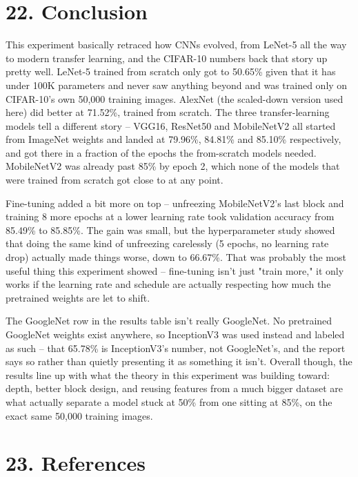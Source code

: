 \documentclass[11pt]{article}
\begin{document}

\section*{22. Conclusion}

This experiment basically retraced how CNNs evolved, from LeNet-5 all the
way to modern transfer learning, and the CIFAR-10 numbers back that story up
pretty well. LeNet-5 trained from scratch only got to 50.65\% given that it has under 100K parameters and never saw anything beyond and was trained only on CIFAR-10's own 50,000 training images. AlexNet (the scaled-down version used
here) did better at 71.52\%, trained from scratch. The three transfer-learning models tell a different story -- VGG16, ResNet50 and MobileNetV2 all started from ImageNet weights and landed at 79.96\%, 84.81\% and 85.10\% respectively, and got there in a fraction of the epochs the from-scratch models needed. MobileNetV2 was already past 85\% by epoch 2, which none of the models that were trained from scratch got close to at any point.

Fine-tuning added a bit more on top -- unfreezing MobileNetV2's last block
and training 8 more epochs at a lower learning rate took validation accuracy
from 85.49\% to 85.85\%. The gain was small, but the hyperparameter study showed that doing the same kind of unfreezing carelessly (5 epochs, no
learning rate drop) actually made things worse, down to 66.67\%. That was
probably the most useful thing this experiment showed -- fine-tuning isn't
just "train more," it only works if the learning rate and schedule are
actually respecting how much the pretrained weights are let to shift.

The GoogleNet row in the results table isn't
really GoogleNet. No pretrained GoogleNet weights exist anywhere, so
InceptionV3 was used instead and labeled as such -- that 65.78\% is
InceptionV3's number, not GoogleNet's, and the report says so rather than
quietly presenting it as something it isn't. Overall though, the results
line up with what the theory in this experiment was building toward: depth,
better block design, and reusing features from a much bigger dataset are
what actually separate a model stuck at 50\% from one sitting at 85\%, on
the exact same 50,000 training images.


\section*{23. References}
\end{document}
